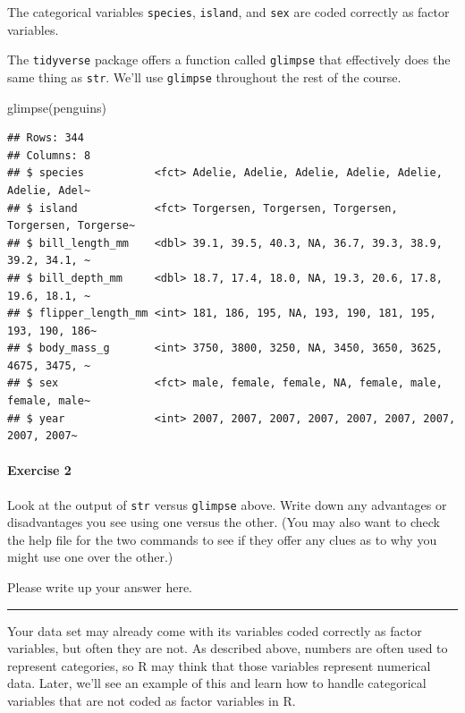 \documentclass[
]{book}
\newenvironment{Shaded}{\begin{snugshade}}{\end{snugshade}}
\newcommand{\FunctionTok}[1]{\textcolor[rgb]{0.00,0.00,0.00}{#1}}
\newcommand{\NormalTok}[1]{#1}
\begin{document}
The categorical variables \texttt{species}, \texttt{island}, and \texttt{sex} are coded correctly as factor variables.

The \texttt{tidyverse} package offers a function called \texttt{glimpse} that effectively does the same thing as \texttt{str}. We'll use \texttt{glimpse} throughout the rest of the course.

\begin{Shaded}
\begin{Highlighting}[]
\FunctionTok{glimpse}\NormalTok{(penguins)}
\end{Highlighting}
\end{Shaded}

\begin{verbatim}
## Rows: 344
## Columns: 8
## $ species           <fct> Adelie, Adelie, Adelie, Adelie, Adelie, Adelie, Adel~
## $ island            <fct> Torgersen, Torgersen, Torgersen, Torgersen, Torgerse~
## $ bill_length_mm    <dbl> 39.1, 39.5, 40.3, NA, 36.7, 39.3, 38.9, 39.2, 34.1, ~
## $ bill_depth_mm     <dbl> 18.7, 17.4, 18.0, NA, 19.3, 20.6, 17.8, 19.6, 18.1, ~
## $ flipper_length_mm <int> 181, 186, 195, NA, 193, 190, 181, 195, 193, 190, 186~
## $ body_mass_g       <int> 3750, 3800, 3250, NA, 3450, 3650, 3625, 4675, 3475, ~
## $ sex               <fct> male, female, female, NA, female, male, female, male~
## $ year              <int> 2007, 2007, 2007, 2007, 2007, 2007, 2007, 2007, 2007~
\end{verbatim}

\hypertarget{exercise-2}{%
\paragraph*{Exercise 2}\label{exercise-2}}

Look at the output of \texttt{str} versus \texttt{glimpse} above. Write down any advantages or disadvantages you see using one versus the other. (You may also want to check the help file for the two commands to see if they offer any clues as to why you might use one over the other.)

Please write up your answer here.

\begin{center}\rule{0.5\linewidth}{0.5pt}\end{center}

Your data set may already come with its variables coded correctly as factor variables, but often they are not. As described above, numbers are often used to represent categories, so R may think that those variables represent numerical data. Later, we'll see an example of this and learn how to handle categorical variables that are not coded as factor variables in R.
\end{document}
